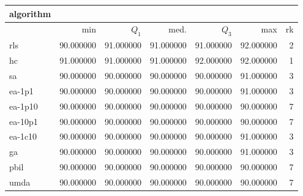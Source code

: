 \begin{tabular}{@{}l*{5}{>{{}}N{3}{0}}>{{}}N{2}{0}@{}}
\toprule
{algorithm} &  \\
\midrule
& {min} & {$Q_1$} & {med.} & {$Q_3$} & {max} & {rk}\\
\midrule
rls & 90.000000 & {\color{blue}} 91.000000 & {\color{blue}} 91.000000 & 91.000000 & {\color{blue}} 92.000000 & 2\\
hc & {\color{blue}} 91.000000 & {\color{blue}} 91.000000 & {\color{blue}} 91.000000 & {\color{blue}} 92.000000 & {\color{blue}} 92.000000 & 1\\
sa & 90.000000 & 90.000000 & 90.000000 & 90.000000 & 91.000000 & 3\\
ea-1p1 & 90.000000 & 90.000000 & 90.000000 & 90.000000 & 91.000000 & 3\\
ea-1p10 & 90.000000 & 90.000000 & 90.000000 & 90.000000 & 90.000000 & 7\\
ea-10p1 & 90.000000 & 90.000000 & 90.000000 & 90.000000 & 90.000000 & 7\\
ea-1c10 & 90.000000 & 90.000000 & 90.000000 & 90.000000 & 91.000000 & 3\\
ga & 90.000000 & 90.000000 & 90.000000 & 90.000000 & 91.000000 & 3\\
pbil & 90.000000 & 90.000000 & 90.000000 & 90.000000 & 90.000000 & 7\\
umda & 90.000000 & 90.000000 & 90.000000 & 90.000000 & 90.000000 & 7\\
\bottomrule
\end{tabular}

